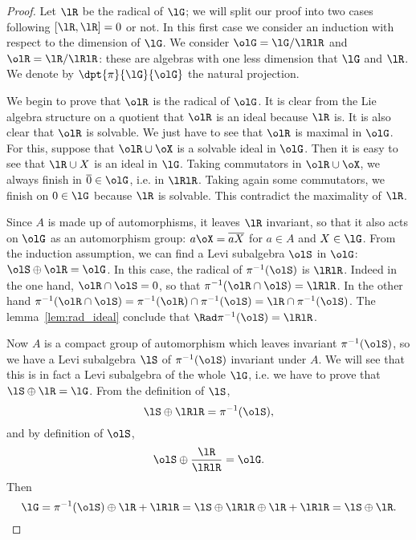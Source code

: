 \begin{proof}
Let $\lR$ be the radical of $\lG$; we will split our proof into two cases following $[\lR,\lR]=0$ or not.
In this first case we consider an induction with respect to the dimension of $\lG$. We consider $\olG=\lG/\lRlR$ and $\olR=\lR/\lRlR$: these are algebras with one less dimension that $\lG$ and $\lR$. We denote by $\dpt{\pi}{\lG}{\olG}$ the natural projection.

We begin to prove that $\olR$ is the radical of $\olG$. It is clear from the Lie algebra structure on a quotient that $\olR$ is an ideal because $\lR$ is. It is also clear that $\olR$ is solvable. We just have to see that $\olR$ is maximal in $\olG$. For this, suppose that $\olR\cup\oX$ is a solvable ideal in $\olG$. Then it is easy to see that $\lR\cup X$ is an ideal in $\lG$. Taking commutators in $\olR\cup\oX$, we always finish in $\overline{0}\in\olG$, i.e. in $\lRlR$. Taking again some commutators, we finish on $0\in\lG$ because $\lR$ is solvable. This contradict the maximality of $\lR$.

Since $A$ is made up of automorphisms, it leaves $\lR$ invariant, so that it also acts on $\olG$ as an automorphism group: $a\oX=\overline{aX}$ for $a\in A$ and $X\in\lG$. From the induction assumption, we can find a Levi subalgebra $\olS$ in $\olG$: $\olS\oplus\olR=\olG$. In this case, the radical of $\pi^{-1}(\olS)$ is $\lRlR$. Indeed in the one hand, $\olR\cap\olS=0$, so that $\pi^{-1}(\olR\cap\olS)=\lRlR$. In the other hand $\pi^{-1}(\olR\cap\olS)=\pi^{-1}(\olR)\cap\pi^{-1}(\olS)=\lR\cap\pi^{-1}(\olS)$. The lemma~\ref{lem:rad_ideal} conclude that $\Rad\pi^{-1}(\olS)=\lRlR$.

Now $A$ is a compact group of automorphism which leaves invariant $\pi^{-1}(\olS)$, so we have a Levi subalgebra $\lS$ of $\pi^{-1}(\olS)$ invariant under $A$. We will see that this is in fact a Levi subalgebra of the whole $\lG$, i.e. we have to prove that $\lS\oplus\lR=\lG$. From the definition of $\lS$,
\[
   \lS\oplus\lRlR=\pi^{-1}(\olS),
\]
and by definition of $\olS$,
\[
   \olS\oplus\frac{\lR}{\lRlR}=\olG.
\]
Then
\begin{equation}
  \lG=\pi^{-1}(\olS)\oplus\lR+\lRlR
     =\lS\oplus\lRlR\oplus\lR+\lRlR
     =\lS\oplus\lR.
\end{equation}


\end{proof}
